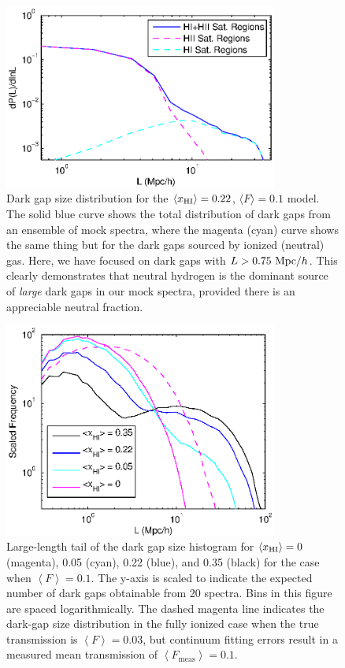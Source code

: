 \begin{figure}[h]
  \centering
  \includegraphics[width=9cm]{fig2.eps}
  \caption{Dark gap size distribution for the $\langle x_{\text{HI}}\rangle = 0.22$, $\langle F \rangle = 0.1$ model. The solid blue curve shows the total distribution of dark gaps from an ensemble of mock spectra, where the magenta (cyan) curve shows the same thing but for the dark gaps sourced by ionized (neutral) gas. Here, we have focused on dark gaps with $L > 0.75 \ \text{Mpc/$h$}$. This clearly demonstrates that neutral hydrogen is the dominant source of {\em large} dark gaps in our mock spectra, provided there is an appreciable neutral fraction.}
  \label{fig:DarkGapHist}
\end{figure}


\begin{figure}[h]
  \centering
  \includegraphics[width=9cm]{fig3.eps}
  \caption{Large-length tail of the dark gap size histogram for $\langle x_{\text{HI}}\rangle = 0$ (magenta), 0.05 (cyan), 0.22 (blue), and 0.35 (black) for the case when $\left\langle F \right\rangle = 0.1$. The y-axis is scaled to indicate the expected number of dark gaps obtainable from 20 spectra. Bins in this figure are spaced logarithmically. The dashed magenta line indicates the dark-gap size distribution in the fully ionized case when the true transmission is $\left\langle F \right\rangle = 0.03$, but continuum fitting errors result in a measured mean transmission of $\left\langle F_{\text{meas}} \right\rangle = 0.1$.}
  \label{fig:PDFs}
\end{figure}


